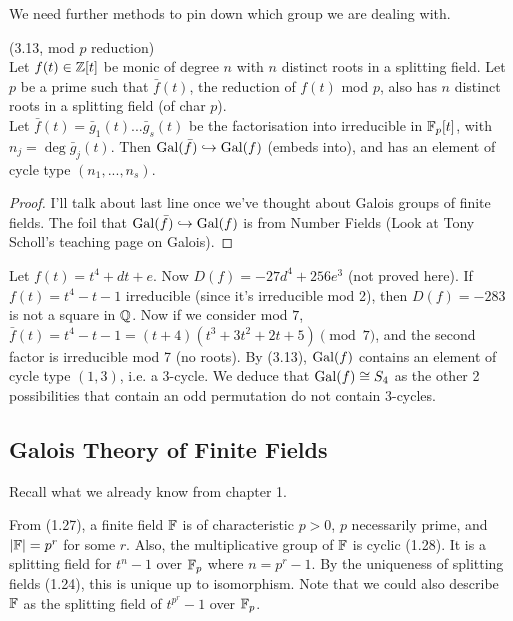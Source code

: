 \documentclass[a4paper]{article}
\begin{document}
We need further methods to pin down which group we are dealing with.

\begin{thm} (3.13, mod $p$ reduction)\\
Let $f(t) \in \mathbb{Z}[t]$ be monic of degree $n$ with $n$ distinct roots in a splitting field. Let $p$ be a prime such that $\bar{f}(t)$, the reduction of $f(t)$ mod $p$, also has $n$ distinct roots in a splitting field (of char $p$).\\
Let $\bar{f}(t) = \bar{g}_1(t) ... \bar{g}_s(t)$ be the factorisation into irreducible in $\mathbb{F}_p[t]$, with $n_j = \deg \bar{g}_j(t)$. Then $\operatorname{Gal}(\bar{f}) \hookrightarrow \operatorname{Gal}(f)$ (embeds into), and has an element of cycle type $(n_1,...,n_s)$.

\begin{rem}
\begin{proof}
I'll talk about last line once we've thought about Galois groups of finite fields. The foil that $\operatorname{Gal}(\bar{f}) \hookrightarrow \operatorname{Gal}(f)$ is from Number Fields (Look at Tony Scholl's teaching page on Galois).
\end{proof}
\end{rem}
\end{thm}

\begin{eg}
Let $f(t) = t^4 + dt + e$. Now $D(f) = -27d^4+256e^3$ (not proved here). If $f(t) = t^4-t-1$ irreducible (since it's irreducible mod 2), then $D(f)=-283$ is not a square in $\mathbb{Q}$. Now if we consider mod $7$, $\bar{f}(t) = t^4 - t - 1 = (t+4)(t^3+3t^2+2t+5) \pmod 7$, and the second factor is irreducible mod 7 (no roots). By (3.13), $\operatorname{Gal}(f)$ contains an element of cycle type $(1,3)$, i.e. a $3$-cycle. We deduce that $\operatorname{Gal}(f) \cong S_4$ as the other 2 possibilities that contain an odd permutation do not contain $3$-cycles.
\end{eg}

\subsection{Galois Theory of Finite Fields}
Recall what we already know from chapter 1.

From (1.27), a finite field $\mathbb{F}$ is of characteristic $p>0$, $p$ necessarily prime, and $|\mathbb{F}| = p^r$ for some $r$. Also, the multiplicative group of $\mathbb{F}$ is cyclic (1.28). It is a splitting field for $t^n-1$ over $\mathbb{F}_p$ where $n = p^r-1$. By the uniqueness of splitting fields (1.24), this is unique up to isomorphism. Note that we could also describe $\mathbb{F}$ as the splitting field of $t^{p^r}-1$ over $\mathbb{F}_p$.
\end{document}
